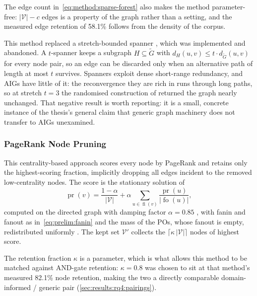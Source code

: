 The edge count in~\eqref{eq:method:sparse-forest} also makes the method parameter-free:
$|\mathcal{V}| - c$ edges is a property of the graph rather than a setting, and the measured
edge retention of 58.1\% follows from the density of the corpus.

This method replaced a stretch-bounded spanner \citep{peleg1989spanners}, which was
implemented and abandoned. A $t$-spanner keeps a subgraph $H \subseteq \tilde{G}$ with
$d_H(u,v) \leq t \cdot d_{\tilde{G}}(u,v)$ for every node pair, so an edge can be discarded
only when an alternative path of length at most $t$ survives. Spanners exploit dense
short-range redundancy, and AIGs have little of it: the reconvergence they are rich in runs
through long paths, so at stretch $t = 3$ the randomised construction of
\citet{baswana2007spanners} returned the graph nearly unchanged. That negative result is
worth reporting: it is a small, concrete instance of the thesis's general claim that generic
graph machinery does not transfer to AIGs unexamined.

\subsubsection{PageRank Node Pruning}
\label{sec:method:sparse:pagerank}
This centrality-based approach scores every node by PageRank and retains only the
highest-scoring fraction, implicitly dropping all edges incident to the removed
low-centrality nodes. The score is the stationary solution of
\begin{equation}
    \operatorname{pr}(v) = \frac{1 - \alpha}{|\mathcal{V}|}
    + \alpha \sum_{u \in \operatorname{fi}(v)}
        \frac{\operatorname{pr}(u)}{|\operatorname{fo}(u)|},
    \label{eq:method:sparse-pagerank}
\end{equation}
computed on the directed graph with damping factor $\alpha = 0.85$
\citep{brin1998anatomy,langville2003pagerank}, with fanin and fanout as
in~\eqref{eq:prelim:fanin} and the mass of the POs, whose fanout is empty, redistributed
uniformly \citep{langville2003pagerank}. The kept set $\mathcal{V}'$ collects the
$\lceil \kappa \, |\mathcal{V}| \rceil$ nodes of highest score.

The retention fraction $\kappa$ is a parameter, which is what allows this method to be
matched against AND-gate retention: $\kappa = 0.8$ was chosen to sit at that method's
measured 82.1\% node retention, making the two a directly comparable domain-informed /
generic pair (\ref{sec:results:rq4:pairings}).
